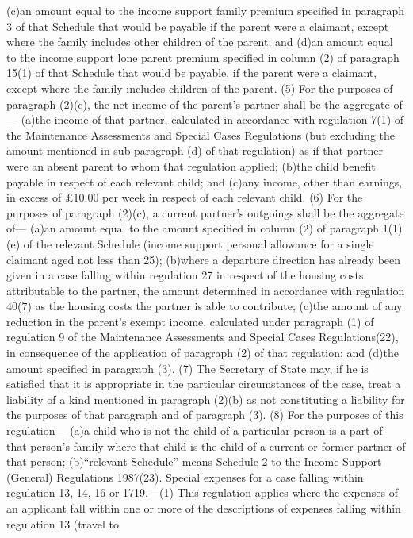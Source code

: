 \documentclass[a4paper]{article}
\begin{document}
(c)an amount equal to the income support family premium specified in paragraph 3
of that Schedule that would be payable if the parent were a claimant, except
where the family includes other children of the parent; and
(d)an amount equal to the income support lone parent premium specified in column
(2) of paragraph 15(1) of that Schedule that would be payable, if the parent
were a claimant, except where the family includes children of the parent.
(5) For the purposes of paragraph (2)(c), the net income of the parent’s partner
shall be the aggregate of—
(a)the income of that partner, calculated in accordance with regulation 7(1) of
the Maintenance Assessments and Special Cases Regulations (but excluding the
amount mentioned in sub-paragraph (d) of that regulation) as if that partner
were an absent parent to whom that regulation applied;
(b)the child benefit payable in respect of each relevant child; and
(c)any income, other than earnings, in excess of £10.00 per week in respect of
each relevant child.
(6) For the purposes of paragraph (2)(c), a current partner’s outgoings shall be
the aggregate of—
(a)an amount equal to the amount specified in column (2) of paragraph 1(1)(e) of
the relevant Schedule (income support personal allowance for a single claimant
aged not less than 25);
(b)where a departure direction has already been given in a case falling within
regulation 27 in respect of the housing costs attributable to the partner, the
amount determined in accordance with regulation 40(7) as the housing costs the
partner is able to contribute;
(c)the amount of any reduction in the parent’s exempt income, calculated under
paragraph (1) of regulation 9 of the Maintenance Assessments and Special Cases
Regulations(22), in consequence of the application of paragraph (2) of that
regulation; and
(d)the amount specified in paragraph (3).
(7) The Secretary of State may, if he is satisfied that it is appropriate in the
particular circumstances of the case, treat a liability of a kind mentioned in
paragraph (2)(b) as not constituting a liability for the purposes of that
paragraph and of paragraph (3).
(8) For the purposes of this regulation—
(a)a child who is not the child of a particular person is a part of that
person’s family where that child is the child of a current or former partner of
that person;
(b)“relevant Schedule” means Schedule 2 to the Income Support (General)
Regulations 1987(23).
Special expenses for a case falling within regulation 13, 14, 16 or 1719.—(1)
This regulation applies where the expenses of an applicant fall within one or
more of the descriptions of expenses falling within regulation 13 (travel to
\end{document}
